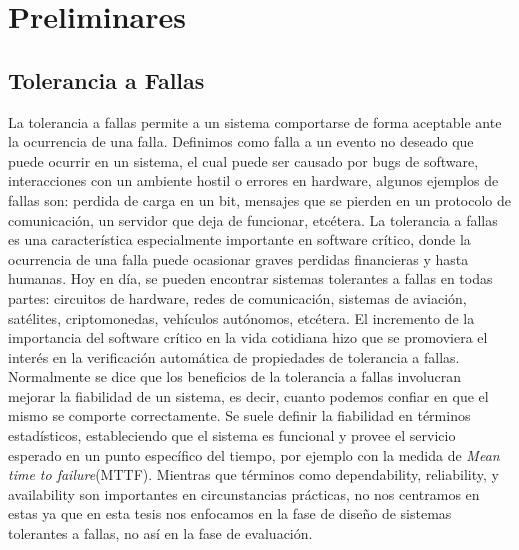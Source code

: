 \chapter{Preliminares}
\label{cap:preliminares}
\section{Tolerancia a Fallas}
La tolerancia a fallas permite a un sistema comportarse de forma aceptable ante la ocurrencia de una falla. Definimos como falla a un evento no deseado que puede ocurrir en un sistema, el cual puede ser causado por bugs de software, interacciones con un ambiente hostil o errores en hardware, algunos ejemplos de fallas son: perdida de carga en un bit, mensajes que se pierden en un protocolo de comunicación, un servidor que deja de funcionar, etcétera.
La tolerancia a fallas es una característica especialmente importante en software crítico, donde la ocurrencia de una falla puede ocasionar graves perdidas financieras y hasta humanas.
Hoy en día, se pueden encontrar sistemas tolerantes a fallas en todas partes: circuitos de hardware, redes de comunicación, sistemas de aviación, satélites, criptomonedas, vehículos autónomos, etcétera.
El incremento de la importancia del software crítico en la vida cotidiana hizo que se promoviera el interés en la verificación automática de propiedades de tolerancia a fallas.
Normalmente se dice que los beneficios de la tolerancia a fallas involucran mejorar la fiabilidad de un sistema, es decir, cuanto podemos confiar en que el mismo se comporte correctamente. Se suele definir la fiabilidad en términos estadísticos, estableciendo que el sistema es funcional y provee el servicio esperado en un punto específico del tiempo, por ejemplo con la medida de \emph{Mean time to failure}(MTTF). Mientras que términos como
dependability, reliability, y availability son importantes en circunstancias prácticas,
no nos centramos en estas ya que en esta tesis nos enfocamos en la fase de diseño de sistemas tolerantes a fallas, no así en la fase de evaluación.

